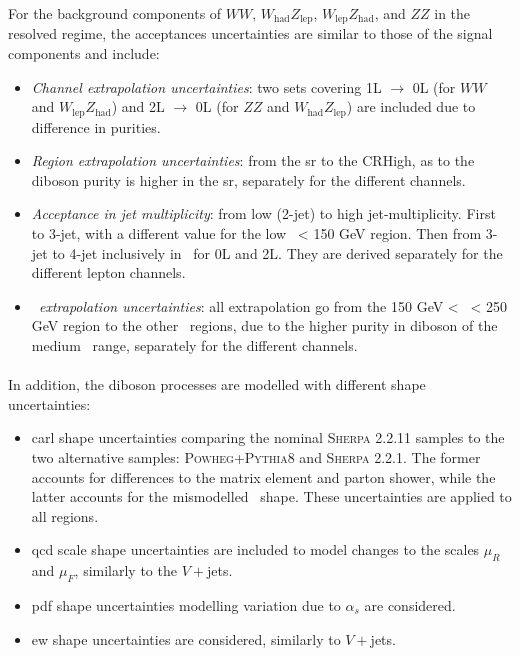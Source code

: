 \newpage
For the background components of $WW$, $W_{\text{had}}Z_{\text{lep}}$, $W_{\text{lep}}Z_{\text{had}}$, and $ZZ$ in the resolved regime, the acceptances uncertainties are similar to those of the signal components and include:
\begin{itemize}[leftmargin=*]
    \item \textit{Channel extrapolation uncertainties}: two sets covering 1L $\rightarrow$ 0L (for $WW$ and $W_{\text{lep}}Z_{\text{had}}$) and 2L $\rightarrow$ 0L (for $ZZ$ and $W_{\text{had}}Z_{\text{lep}}$) are included due to difference in purities.
    \item \textit{Region extrapolation uncertainties}: from the \gls{sr} to the CRHigh, as to the diboson purity is higher in the \gls{sr}, separately for the different channels.
    \item \textit{Acceptance in jet multiplicity}: from low (2-jet) to high jet-multiplicity. First to 3-jet, with a different value for the low \ptv\ < 150 GeV region. Then from 3-jet to 4-jet inclusively in \ptv\ for 0L and 2L. They are derived separately for the different lepton channels. 
    \item \textit{\ptv\ extrapolation uncertainties}: all extrapolation go from the 150 GeV < \ptv\ < 250 GeV region to the other \ptv\ regions, due to the higher purity in diboson of the medium \ptv\ range, separately for the different channels.
\end{itemize}

\paragraph{}In addition, the diboson processes are modelled with different shape uncertainties:
\begin{itemize}[leftmargin=*]
    \item \gls{carl} shape uncertainties comparing the nominal \textsc{Sherpa} 2.2.11 samples to the two alternative samples: \textsc{Powheg}+\textsc{Pythia}8 and \textsc{Sherpa} 2.2.1. The former accounts for differences to the matrix element and parton shower, while the latter accounts for the mismodelled \ptv\ shape. These uncertainties are applied to all regions.
    \item \gls{qcd} scale shape uncertainties are included to model changes to the scales $\mu_R$ and $\mu_F$, similarly to the $V+$jets.
    \item \gls{pdf} shape uncertainties modelling variation due to $\alpha_s$ are considered.
    \item \gls{ew} shape uncertainties are considered, similarly to $V+$jets.
\end{itemize}

